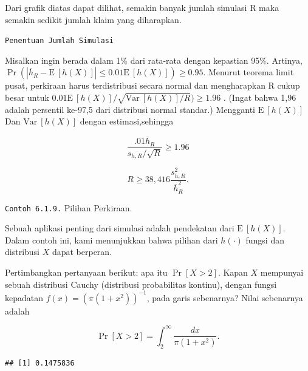 \documentclass[
]{book}
\newenvironment{Shaded}{\begin{snugshade}}{\end{snugshade}}
\newcommand{\AttributeTok}[1]{\textcolor[rgb]{0.77,0.63,0.00}{#1}}
\newcommand{\ConstantTok}[1]{\textcolor[rgb]{0.00,0.00,0.00}{#1}}
\newcommand{\ControlFlowTok}[1]{\textcolor[rgb]{0.13,0.29,0.53}{\textbf{#1}}}
\newcommand{\DecValTok}[1]{\textcolor[rgb]{0.00,0.00,0.81}{#1}}
\newcommand{\FunctionTok}[1]{\textcolor[rgb]{0.00,0.00,0.00}{#1}}
\newcommand{\NormalTok}[1]{#1}
\newcommand{\OtherTok}[1]{\textcolor[rgb]{0.56,0.35,0.01}{#1}}
\newcommand{\SpecialCharTok}[1]{\textcolor[rgb]{0.00,0.00,0.00}{#1}}
\begin{document}
Dari grafik diatas dapat dilihat, semakin banyak jumlah simulasi R maka semakin sedikit jumlah klaim yang diharapkan.

\texttt{Penentuan\ Jumlah\ Simulasi}

Misalkan ingin berada dalam 1\% dari rata-rata dengan kepastian 95\%. Artinya, \(\Pr \left( |\overline{h}_R - \mathrm{E~}[h(X)]| \le 0.01 \mathrm{E~}[h(X)] \right) \ge 0.95\). Menurut teorema limit pusat, perkiraan harus terdistribusi secara normal dan mengharapkan R cukup besar untuk \(0.01 \mathrm{E~}[h(X)]/\sqrt{\mathrm{Var~}[h(X)]/R}) \ge 1.96\) . (Ingat bahwa 1,96 adalah persentil ke-97,5 dari distribusi normal standar.) Mengganti \(\mathrm{E~}[h(X)]\) Dan \(\mathrm{Var~}[h(X)]\) dengan estimasi,sehingga

\[\frac{.01\overline{h}_R}{s_{h,R}/\sqrt{R}}\geq 1.96\]

\[\begin{equation}
R \geq 38,416\frac{s_{h,R}^2}{\overline{h}_R^2}.
\tag{6.1}
\end{equation}\]

\texttt{Contoh\ 6.1.9.} Pilihan Perkiraan.

Sebuah aplikasi penting dari simulasi adalah pendekatan dari \(\mathrm{E~}[h(X)]\). Dalam contoh ini, kami menunjukkan bahwa pilihan dari \(h(\cdot)\) fungsi dan distribusi \(X\) dapat berperan.

Pertimbangkan pertanyaan berikut: apa itu \(\Pr[X>2]\). Kapan \(X\) mempunyai sebuah distribusi Cauchy (distribusi probabilitas kontinu), dengan fungsi kepadatan \(f(x) =\left(\pi(1+x^2)\right)^{-1}\), pada garis sebenarnya? Nilai sebenarnya adalah

\[\Pr\left[X>2\right] = \int_2^\infty \frac{dx}{\pi(1+x^2)} .\]

\begin{Shaded}
\end{Shaded}

\begin{verbatim}
## [1] 0.1475836
\end{verbatim}
\end{document}
